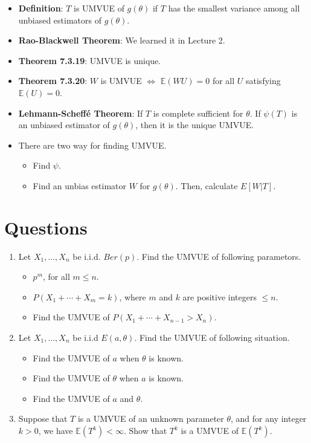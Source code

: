 \documentclass[12pt]{extarticle}
\newcommand{\E}{\mathbb E}
\begin{document}
\begin{itemize}
\begin{itemize}
	
	\item \textbf{Definition}: $T$ is UMVUE of $g(\theta)$ if $T$ has the smallest variance among all unbiased estimators of $g(\theta)$.
	\item \textbf{Rao-Blackwell Theorem}: We learned it in Lecture 2.
	\item \textbf{Theorem 7.3.19}: UMVUE is unique.
	\item \textbf{Theorem 7.3.20}: $W$ is UMVUE $\Leftrightarrow$ $\E(WU)=0$ for all $U$ satisfying $\E (U)=0$.
	\item \textbf{Lehmann-Scheff\'e Theorem}: If $T$ is complete sufficient for $\theta$. If $\psi(T)$ is an unbiased estimator of $g(\theta)$, then it is the unique UMVUE.
 \item There are two way for finding UMVUE.
 \begin{itemize}
 	\item Find $\psi$.
 	\item Find an unbias estimator $W$ for $g(\theta)$. Then, calculate $E[W|T]$.
 \end{itemize}
\end{itemize}

\end{itemize}


\section{Questions}
\begin{enumerate}
	\item Let $X_1,\dots,X_n$ be i.i.d. $Ber(p)$. Find the UMVUE of following parametors.
	\begin{itemize}
		\item $p^m$, for all $m\leq n.$
		\item $P(X_1+\cdots+X_m=k)$, where $m$ and $k$ are positive integers $\leq n.$
		\item Find the UMVUE of $P(X_1+\cdots+X_{n-1} >X_n)$.
	\end{itemize}
\vspace{3cm}
\item Let $X_1,\dots,X_n$ be i.i.d $E(a,\theta)$. Find the UMVUE of following situation.
\begin{itemize}
\item Find the UMVUE of $a$ when $\theta$ is known.
\item Find the UMVUE of $\theta$ when $a$ is known.
\item Find the UMVUE of $a$ and $\theta$.
\end{itemize}
\vspace{3cm}
 	\item Suppose that $T$ is a UMVUE of an unknown parameter $\theta$, and for any integer $k>0$, we have $\E(T^k) < \infty$. Show that $T^k$ is a UMVUE of $\E(T^k)$.
\end{enumerate}
\end{document}
